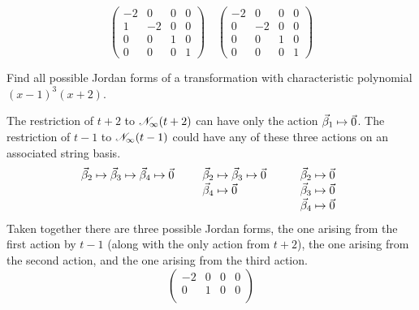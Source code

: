 \begin{exercises}
\begin{answer}
\begin{equation*}
        \begin{pmatrix}
          -2  &0  &0  &0  \\
           1  &-2 &0  &0  \\
           0  &0  &1  &0  \\
           0  &0  &0  &1
        \end{pmatrix}
        \quad
        \begin{pmatrix}
          -2  &0  &0  &0  \\
           0  &-2 &0  &0  \\
           0  &0  &1  &0  \\
           0  &0  &0  &1
        \end{pmatrix}
     \end{equation*}  
    \end{answer}
  \item 
    Find all possible Jordan forms of a transformation with characteristic
    polynomial \( (x-1)^3(x+2) \).
    \begin{answer}
     The restriction of $t+2$ to 
     $\mathscr{N}_\infty(t+2)$ can have only the action
     $\vec{\beta}_1\mapsto\vec{0}$.
     The restriction of $t-1$ to $\mathscr{N}_\infty(t-1)$ could have any
     of these three actions on an associated string basis. 
     \begin{equation*}
        \vec{\beta}_2\mapsto\vec{\beta}_3\mapsto\vec{\beta}_4\mapsto\vec{0}
        \qquad
        \begin{array}[t]{l}
          \vec{\beta}_2\mapsto\vec{\beta}_3\mapsto\vec{0}  \\
          \vec{\beta}_4\mapsto\vec{0} 
        \end{array}
        \qquad
        \begin{array}[t]{l}
          \vec{\beta}_2\mapsto\vec{0}  \\
          \vec{\beta}_3\mapsto\vec{0}  \\
          \vec{\beta}_4\mapsto\vec{0} 
        \end{array}
     \end{equation*}
     Taken together there are three possible Jordan forms,
     the one arising from the first action by $t-1$ (along with the only
     action from $t+2$), the one arising from the second action, and
     the one arising from the third action.
     \begin{equation*}
       \begin{pmatrix}
         -2  &0  &0  &0  \\
          0  &1  &0  &0  \\

\end{pmatrix}
\end{equation*}
\end{answer}
\end{exercises}
